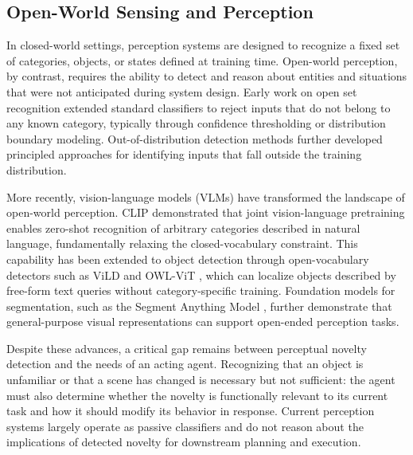 \subsection{Open-World Sensing and Perception}
\label{sec:rw_sensing}

In closed-world settings, perception systems are designed to recognize a fixed set of categories, objects, or states defined at training time. Open-world perception, by contrast, requires the ability to detect and reason about entities and situations that were not anticipated during system design. Early work on open set recognition \citep{scheirer2013toward, bendale2016towards} extended standard classifiers to reject inputs that do not belong to any known category, typically through confidence thresholding or distribution boundary modeling. Out-of-distribution detection methods \citep{hendrycks2017baseline} further developed principled approaches for identifying inputs that fall outside the training distribution.

More recently, vision-language models (VLMs) have transformed the landscape of open-world perception. CLIP \citep{radford2021learning} demonstrated that joint vision-language pretraining enables zero-shot recognition of arbitrary categories described in natural language, fundamentally relaxing the closed-vocabulary constraint. This capability has been extended to object detection through open-vocabulary detectors such as ViLD \citep{gu2022openvocabulary} and OWL-ViT \citep{minderer2022simple}, which can localize objects described by free-form text queries without category-specific training. Foundation models for segmentation, such as the Segment Anything Model \citep{kirillov2023segment}, further demonstrate that general-purpose visual representations can support open-ended perception tasks.

Despite these advances, a critical gap remains between perceptual novelty detection and the needs of an acting agent. Recognizing that an object is unfamiliar or that a scene has changed is necessary but not sufficient: the agent must also determine whether the novelty is functionally relevant to its current task and how it should modify its behavior in response. Current perception systems largely operate as passive classifiers and do not reason about the implications of detected novelty for downstream planning and execution.